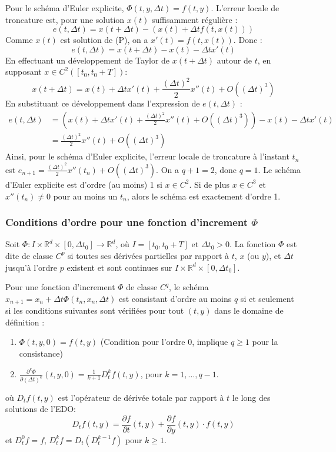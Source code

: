 \begin{example}
Pour le schéma d'Euler explicite, $\Phi(t, y, \Delta t) = f(t, y)$. L'erreur locale de troncature est, pour une solution $x(t)$ suffisamment régulière :
\[
e(t, \Delta t) = x(t+\Delta t) - (x(t) + \Delta t f(t, x(t)))
\]
Comme $x(t)$ est solution de (P), on a $x'(t) = f(t, x(t))$. Donc :
\[
e(t, \Delta t) = x(t+\Delta t) - x(t) - \Delta t x'(t)
\]
En effectuant un développement de Taylor de $x(t+\Delta t)$ autour de $t$, en supposant $x \in C^2([t_0, t_0+T])$:
\[
x(t+\Delta t) = x(t) + \Delta t x'(t) + \frac{(\Delta t)^2}{2} x''(t) + O((\Delta t)^3)
\]
En substituant ce développement dans l'expression de $e(t, \Delta t)$ :
\begin{align*}
e(t, \Delta t) &= \left( x(t) + \Delta t x'(t) + \frac{(\Delta t)^2}{2} x''(t) + O((\Delta t)^3) \right) - x(t) - \Delta t x'(t) \\
&= \frac{(\Delta t)^2}{2} x''(t) + O((\Delta t)^3)
\end{align*}
Ainsi, pour le schéma d'Euler explicite, l'erreur locale de troncature à l'instant $t_n$ est $e_{n+1} = \frac{(\Delta t)^2}{2} x''(t_n) + O((\Delta t)^3)$.
On a $q+1 = 2$, donc $q=1$. Le schéma d'Euler explicite est d'ordre (au moins) 1 si $x \in C^2$. Si de plus $x \in C^3$ et $x''(t_n) \neq 0$ pour au moins un $t_n$, alors le schéma est exactement d'ordre 1.
\end{example}

\subsubsection{Conditions d'ordre pour une fonction d'increment $\Phi$}
\begin{remark}
Soit $\Phi: I \times \mathbb{R}^d \times [0, \Delta t_0] \to \mathbb{R}^d$, où $I = [t_0, t_0+T]$ et $\Delta t_0 > 0$.
La fonction $\Phi$ est dite de classe $C^p$ si toutes ses dérivées partielles par rapport à $t$, $x$ (ou $y$), et $\Delta t$ jusqu'à l'ordre $p$ existent et sont continues sur $I \times \mathbb{R}^d \times [0, \Delta t_0]$.
\end{remark}

Pour une fonction d'increment $\Phi$ de classe $C^q$, le schéma $x_{n+1} = x_n + \Delta t \Phi(t_n, x_n, \Delta t)$ est consistant d'ordre au moins $q$ si et seulement si les conditions suivantes sont vérifiées pour tout $(t,y)$ dans le domaine de définition :
\begin{enumerate}
    \item $\Phi(t,y,0) = f(t,y)$ (Condition pour l'ordre 0, implique $q \ge 1$ pour la consistance)
    \item $\displaystyle \frac{\partial^k \Phi}{\partial (\Delta t)^k}(t,y,0) = \frac{1}{k+1} D_t^k f(t,y)$, pour $k=1, \dots, q-1$.
\end{enumerate}
où $D_t f(t,y)$ est l'opérateur de dérivée totale par rapport à $t$ le long des solutions de l'EDO:
\[
D_t f(t,y) = \frac{\partial f}{\partial t}(t,y) + \frac{\partial f}{\partial y}(t,y) \cdot f(t,y)
\]
et $D_t^0 f = f$, $D_t^k f = D_t(D_t^{k-1}f)$ pour $k \ge 1$.

